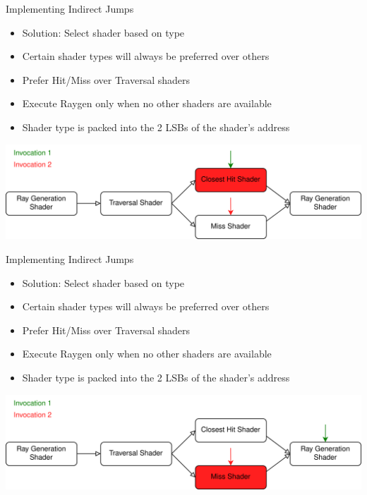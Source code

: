 \documentclass[aspectratio=169,t]{beamer}
\begin{document}
\begin{slide}{Implementing Indirect Jumps}
 \begin{itemize}
  \item Solution: Select shader based on type
  \item Certain shader types will always be preferred over others
  \item Prefer Hit/Miss over Traversal shaders
  \item Execute Raygen only when no other shaders are available
  \item Shader type is packed into the 2 LSBs of the shader's address
 \end{itemize}
 \includegraphics[width=\textwidth]{graphics/RTStages2-3.png}
\end{slide}

\begin{slide}{Implementing Indirect Jumps}
 \begin{itemize}
  \item Solution: Select shader based on type
  \item Certain shader types will always be preferred over others
  \item Prefer Hit/Miss over Traversal shaders
  \item Execute Raygen only when no other shaders are available
  \item Shader type is packed into the 2 LSBs of the shader's address
 \end{itemize}
 \includegraphics[width=\textwidth]{graphics/RTStages2-7.png}
\end{slide}
\end{document}
